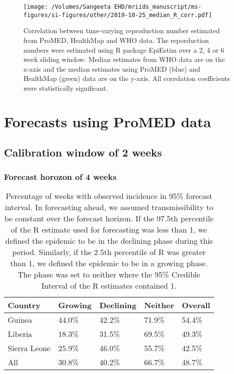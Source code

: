 \documentclass[9pt,twoside,lineno]{pnas-new}
\begin{document}
\begin{figure}
  \centering
  \texttt{[image: /Volumes/Sangeeta EHD/mriids\_manuscript/ms-figures/si-figures/other/2019-10-25\_median\_R\_corr.pdf]}
  \caption{Correlation between time-varying reproduction number estimated from
    ProMED, HealthMap and WHO data. The reporduction numbers were
    estimated using R package EpiEstim over a 2, 4 or 6 week sliding
    window. Median estimates from WHO data are on the x-axis and the
    median estimates using ProMED (blue) and HealthMap (green) data
    are on the y-axis. All correlation coefficients were statistically
  significant.}
  \label{fig:rcorr}
\end{figure}


\section{Forecasts using ProMED data}\label{forecasts-using-promed-data}
\subsection{Calibration window of 2 weeks}\label{calibration-window-of-2-weeks}
\subsubsection{Forecast horozon of 4 weeks}

\begin{table}
  \centering
  \caption{Percentage of weeks with observed incidence in 95\% forecast
    interval. In forecasting ahead, we assumed transmissibility to be
    constant over the forecast horizon. If the 97.5th percentile of the R
    estimate used for forecasting was less than 1, we defined the epidemic
    to be in the declining phase during this period. Similarly, if the 2.5th
    percentile of R was greater than 1, we defined the epidemic to be in a
    growing phase. The phase was set to neither where the 95\% Credible
    Interval of the R estimates contained 1.}
  \label{tab:propinci}
  \begin{tabular}{lllll}
    \toprule
    Country  & Growing & Declining & Neither & Overall \\
    \midrule
    Guinea  & 44.0\% & 42.2\% & 71.9\% & 54.4\% \\
    Liberia & 18.3\% & 31.5\% & 69.5\% & 49.3\% \\
    Sierra Leone & 25.9\% & 46.0\% & 55.7\% & 42.5\% \\
    All & 30.8\% & 40.2\% & 66.7\% & 48.7\% \\
    \bottomrule
  \end{tabular}
\end{table}
\end{document}
